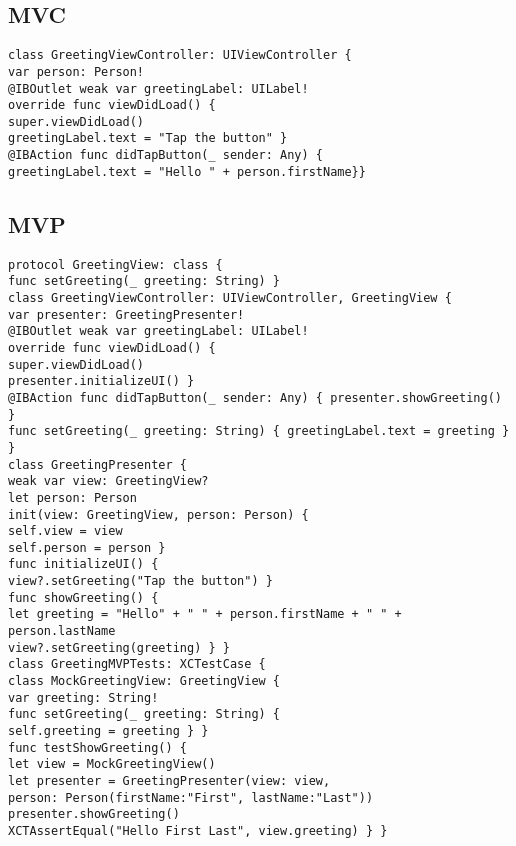 \subsection{MVC}
%
%
%

\begin{lstlisting}
class GreetingViewController: UIViewController {
var person: Person!
@IBOutlet weak var greetingLabel: UILabel!
override func viewDidLoad() {
super.viewDidLoad()
greetingLabel.text = "Tap the button" }
@IBAction func didTapButton(_ sender: Any) {
greetingLabel.text = "Hello " + person.firstName}}
\end{lstlisting}

\subsection{MVP}
%
%

\begin{lstlisting}
protocol GreetingView: class {
func setGreeting(_ greeting: String) }
class GreetingViewController: UIViewController, GreetingView {
var presenter: GreetingPresenter!
@IBOutlet weak var greetingLabel: UILabel!
override func viewDidLoad() {
super.viewDidLoad()
presenter.initializeUI() }
@IBAction func didTapButton(_ sender: Any) { presenter.showGreeting() }
func setGreeting(_ greeting: String) { greetingLabel.text = greeting } }
class GreetingPresenter {
weak var view: GreetingView?
let person: Person
init(view: GreetingView, person: Person) {
self.view = view
self.person = person }
func initializeUI() {
view?.setGreeting("Tap the button") }
func showGreeting() {
let greeting = "Hello" + " " + person.firstName + " " + person.lastName
view?.setGreeting(greeting) } }
class GreetingMVPTests: XCTestCase {
class MockGreetingView: GreetingView {
var greeting: String!
func setGreeting(_ greeting: String) {
self.greeting = greeting } }
func testShowGreeting() {
let view = MockGreetingView()
let presenter = GreetingPresenter(view: view,
person: Person(firstName:"First", lastName:"Last"))
presenter.showGreeting()
XCTAssertEqual("Hello First Last", view.greeting) } }
\end{lstlisting}

